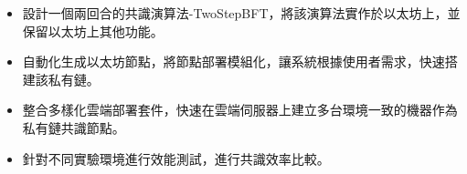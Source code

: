 \begin{itemize}%
\item 設計一個兩回合的共識演算法-TwoStepBFT，將該演算法實作於以太坊上，並保留以太坊上其他功能。
\item 自動化生成以太坊節點，將節點部署模組化，讓系統根據使用者需求，快速搭建該私有鏈。
\item 整合多樣化雲端部署套件，快速在雲端伺服器上建立多台環境一致的機器作為私有鏈共識節點。
\item 針對不同實驗環境進行效能測試，進行共識效率比較。 
\end{itemize}






